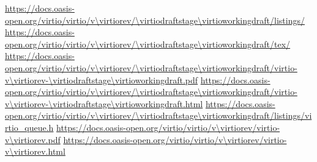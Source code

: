 
\newcommand{\virtioversion}{Virtual I/O Device (VIRTIO) Version \virtiorev}
\newcommand{\virtiospecfile}{virtio-v\virtiorev-\virtiodraftstage\virtioworkingdraft}
\newcommand{\virtiourlbase}{https://docs.oasis-open.org/virtio/virtio/v\virtiorev/\virtiodraftstage\virtioworkingdraft}
\urldef{\virtiourllistings}\url{\virtiourlbase/listings/}
\urldef{\virtiourltex}\url{\virtiourlbase/tex/}
\urldef{\virtiourlpdf}\url{\virtiourlbase/\virtiospecfile.pdf}
\urldef{\virtiourlhtml}\url{\virtiourlbase/\virtiospecfile.html}
\urldef{\virtiourlh}\url{\virtiourlbase/listings/virtio_queue.h}
\urldef{\virtiourllatestpdf}\url{https://docs.oasis-open.org/virtio/virtio/v\virtiorev/virtio-v\virtiorev.pdf}
\urldef{\virtiourllatesthtml}\url{https://docs.oasis-open.org/virtio/virtio/v\virtiorev/virtio-v\virtiorev.html}
\newcommand{\virtioworkproduct}{Standards Track Work Product}
\newcommand{\virtiooasiscopyright}{Copyright © OASIS Open 2023. All Rights Reserved.}

